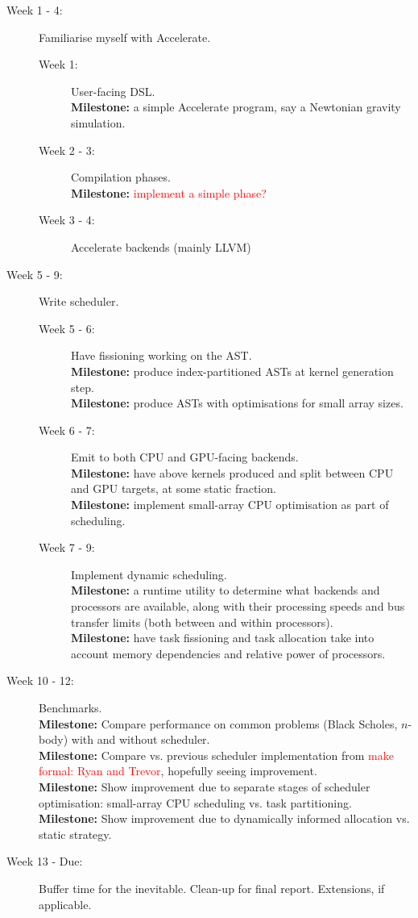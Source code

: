 \documentclass[a4paper,12pt]{article}
\newcommand{\red}[1]{\textcolor{red}{#1}}
\newcommand{\milestone}[0]{\textbf{Milestone:} }
\begin{document}
\begin{description}
  \item[Week 1 - 4:] 
    Familiarise myself with Accelerate.
    \begin{description}
      \item[Week 1:] 
        User-facing DSL. 
        \\\milestone a simple Accelerate program, say a Newtonian gravity simulation.
      \item[Week 2 - 3:] 
        Compilation phases. 
        \\\milestone \red{implement a simple phase?}
      \item[Week 3 - 4:] 
        Accelerate backends (mainly LLVM)
    \end{description}
  \item[Week 5 - 9:] 
    Write scheduler.
    \begin{description}
      \item[Week 5 - 6:] 
        Have fissioning working on the AST. 
        \\\milestone produce index-partitioned ASTs at kernel generation step.
        \\\milestone produce ASTs with optimisations for small array sizes.
      \item[Week 6 - 7:]
        Emit to both CPU and GPU-facing backends. 
        \\\milestone have above kernels produced and split between CPU and GPU targets, at some static fraction.
        \\\milestone implement small-array CPU optimisation as part of scheduling.
      \item[Week 7 - 9:]
        Implement dynamic scheduling.
        \\\milestone a runtime utility to determine what backends and processors are available, along with their processing speeds and bus transfer limits (both between and within processors).
        \\\milestone have task fissioning and task allocation take into account memory dependencies and relative power of processors.
    \end{description}
  \item[Week 10 - 12:]
    Benchmarks.
    \\\milestone Compare performance on common problems (Black Scholes, $n$-body) with and without scheduler.
    \\\milestone Compare vs. previous scheduler implementation from \red{make formal: Ryan and Trevor}, hopefully seeing improvement.
    \\\milestone Show improvement due to separate stages of scheduler optimisation: small-array CPU scheduling vs. task partitioning.
    \\\milestone Show improvement due to dynamically informed allocation vs. static strategy.
  \item[Week 13 - Due:] Buffer time for the inevitable. Clean-up for final report. Extensions, if applicable.
\end{description}
\end{document}
